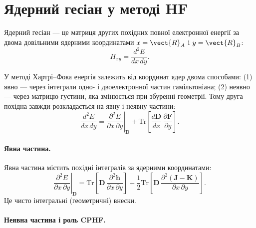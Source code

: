 \section{Ядерний гесіан у методі HF}

Ядерний гесіан --- це матриця других похідних повної електронної
енергії за двома довільними ядерними координатами $x=\vect{R}_A$ і $y=\vect{R}_B$:
\begin{equation}\label{eq:HF_Hessian_def}
	H_{xy}
	=
	\frac{d^2 E}{dx\,dy}.
\end{equation}

У методі Хартрі--Фока енергія залежить від координат ядер двома способами:
(1) явно — через інтеграли одно- і двоелектронної частин гамільтоніана;
(2) неявно — через матрицю густини, яка змінюється при збуренні геометрії.
Тому друга похідна завжди розкладається на явну і неявну частини:
\begin{equation}\label{eq:HF_Hessian_split}
	\frac{d^2E}{dx\,dy}
	=
	\left.
	\frac{\partial^2E}{\partial x\,\partial y}
	\right|_{\mathbf D}
	+
	\mathrm{Tr}
	\!\left[
		\frac{d\mathbf D}{dx}\,
		\frac{\partial \mathbf F}{\partial y}
		\right].
\end{equation}

\paragraph{Явна частина.}

Явна частина містить похідні інтегралів за ядерними координатами:
\begin{equation}
	\left.
	\frac{\partial^2E}{\partial x\,\partial y}
	\right|_{\mathbf D}
	=
	\mathrm{Tr}\!\left[
		\mathbf D\,\frac{\partial^2 \mathbf h}{\partial x\,\partial y}
		\right]
	+
	\frac12
	\mathrm{Tr}\!\left[
		\mathbf D\,\frac{\partial^2 (\mathbf J - \mathbf K)}{\partial x\,\partial y}
		\right].
\end{equation}
Це чисто інтегральні (геометричні) внески.

\paragraph{Неявна частина і роль CPHF.}

